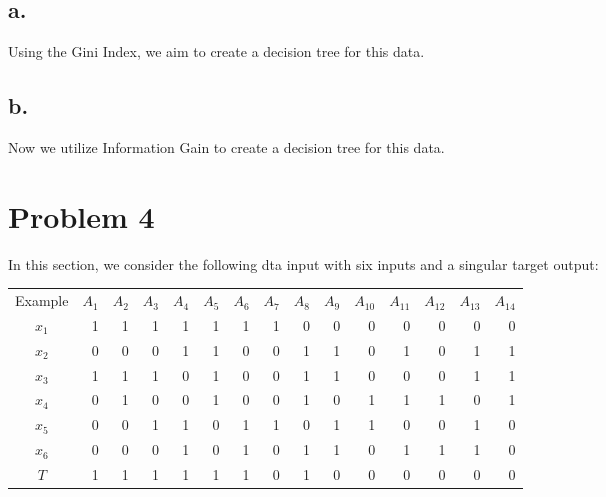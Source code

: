 \documentclass{article}
\begin{document}
\subsection*{a.}

Using the Gini Index, we aim to create a decision tree for this data.

\subsection*{b.}

Now we utilize Information Gain to create a decision tree for this data.

\section*{Problem 4}

In this section, we consider the following dta input with six inputs and a singular target output:

\begin{center}
    \begin{tabular}{c r r r r r r r r r r r r r r}
        Example & $A_1$ & $A_2$ & $A_3$ & $A_4$ & $A_5$ & $A_6$ & $A_7$ & $A_8$ & $A_9$ & $A_10$ & $A_11$ & $A_12$ & $A_13$ & $A_14$ \\
        $x_1$ & 1 & 1 & 1 & 1 & 1 & 1 & 1 & 0 & 0 & 0 & 0 & 0 & 0 & 0 \\
        $x_2$ & 0 & 0 & 0 & 1 & 1 & 0 & 0 & 1 & 1 & 0 & 1 & 0 & 1 & 1 \\
        $x_3$ & 1 & 1 & 1 & 0 & 1 & 0 & 0 & 1 & 1 & 0 & 0 & 0 & 1 & 1 \\
        $x_4$ & 0 & 1 & 0 & 0 & 1 & 0 & 0 & 1 & 0 & 1 & 1 & 1 & 0 & 1 \\
        $x_5$ & 0 & 0 & 1 & 1 & 0 & 1 & 1 & 0 & 1 & 1 & 0 & 0 & 1 & 0 \\
        $x_6$ & 0 & 0 & 0 & 1 & 0 & 1 & 0 & 1 & 1 & 0 & 1 & 1 & 1 & 0 \\
        $T$ & 1 & 1 & 1 & 1 & 1 & 1 & 0 & 1 & 0 & 0 & 0 & 0 & 0 & 0 \\

    \end{tabular}
\end{center}
\end{document}
